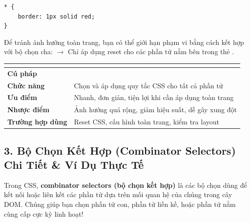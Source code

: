 \begin{codeWindow}
\begin{lstlisting}[language=CSS3]
* {
    border: 1px solid red;
}
\end{lstlisting}
\end{codeWindow}

\begin{noteBox}
Để tránh ảnh hưởng toàn trang, bạn có thể giới hạn phạm vi bằng cách kết hợp với bộ chọn cha:
 $\rightarrow$ Chỉ áp dụng reset cho các phần tử nằm bên trong thẻ .
\end{noteBox}

\begin{prettyTableBox}
\sffamily\small
\begin{tabularx}{\linewidth}{|>{\bfseries\color{primaryBlue}}K{3.5cm}|Z|}
\hline
{}  &  \\
\hline
Cú pháp &  \\
\hline
Chức năng & Chọn và áp dụng quy tắc CSS cho tất cả phần tử \\
\hline
Ưu điểm & Nhanh, đơn giản, tiện lợi khi cần áp dụng toàn trang \\
\hline
Nhược điểm & Ảnh hưởng quá rộng, giảm hiệu suất, dễ gây xung đột \\
\hline
Trường hợp dùng & Reset CSS, cấu hình toàn trang, kiểm tra layout \\
\hline
\end{tabularx}
\end{prettyTableBox}

\subsection{3. Bộ Chọn Kết Hợp (Combinator Selectors) Chi Tiết \& Ví Dụ Thực Tế}

\begin{conceptBox}
Trong CSS, \textbf{combinator selectors (bộ chọn kết hợp)} là các bộ chọn dùng để kết nối hoặc liên kết các phần tử dựa trên mối quan hệ của chúng trong cây DOM. Chúng giúp bạn chọn phần tử con, phần tử liền kề, hoặc phần tử nằm cùng cấp cực kỳ linh hoạt!
\end{conceptBox}

